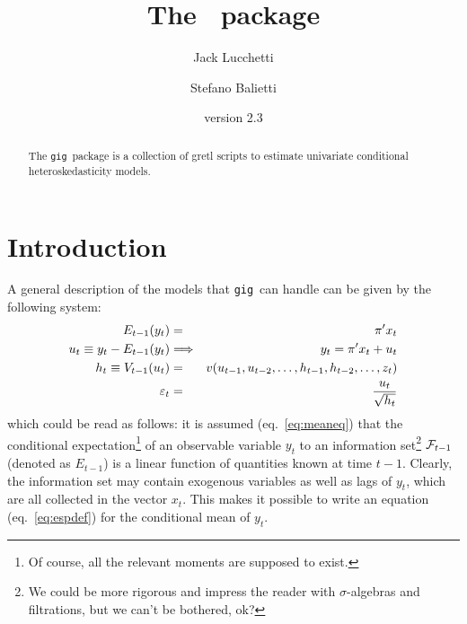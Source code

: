 \documentclass[a4paper,11pt]{article}
\title{The \gig\ package}
\author{Jack Lucchetti \and Stefano Balietti}
\date{version 2.3}
\newcommand{\app}[1]{\textsf{#1}}
\newcounter{script}[section]
\newcommand{\stdu}{\ensuremath \varepsilon}
\newcommand{\uhat}{\ensuremath u}
\newcommand{\InfSet}[1]{\ensuremath \mathcal{F}_{#1}}
\newcommand{\gig}{\texttt{gig}}
\begin{document}
\maketitle

\begin{abstract}
The \gig\ package is a collection of \app{gretl} scripts to estimate
univariate conditional heteroskedasticity models. %
\end{abstract}

\tableofcontents

\section{Introduction}

A general description of the models that \gig\ can handle can be given
by the following system:
\begin{eqnarray}
  \label{eq:meaneq}
  E_{t-1}(y_t) & = & \pi'x_t \\
  \label{eq:espdef}
  \uhat_{t} \equiv y_t - E_{t-1}(y_t) & \Longrightarrow &
  y_t = \pi'x_t + \uhat_{t} \\
  \label{eq:vareq}
  h_t \equiv V_{t-1}(\uhat_{t}) & = & 
  v(\uhat_{t-1}, \uhat_{t-2}, \ldots, 
  h_{t-1}, h_{t-2}, \ldots, z_t) \\
  \label{eq:stdinn}
  \stdu_t & = & \frac{\uhat_{t}}{\sqrt{h_t}}
\end{eqnarray}
which could be read as follows: it is assumed (eq.~\ref{eq:meaneq})
that the conditional expectation\footnote{Of course, all the relevant
  moments are supposed to exist.} of an observable variable $y_t$ to an
information set\footnote{We could be more rigorous and impress the
  reader with $\sigma$-algebras and filtrations, but we can't be
  bothered, ok?}  $\InfSet{t-1}$ (denoted as $E_{t-1}$) is a linear
function of quantities known at time $t-1$. Clearly, the information
set may contain exogenous variables as well as lags of $y_t$, which
are all collected in the vector $x_t$. This makes it possible to write
an equation (eq.~\ref{eq:espdef}) for the conditional mean of $y_t$.
\end{document}
